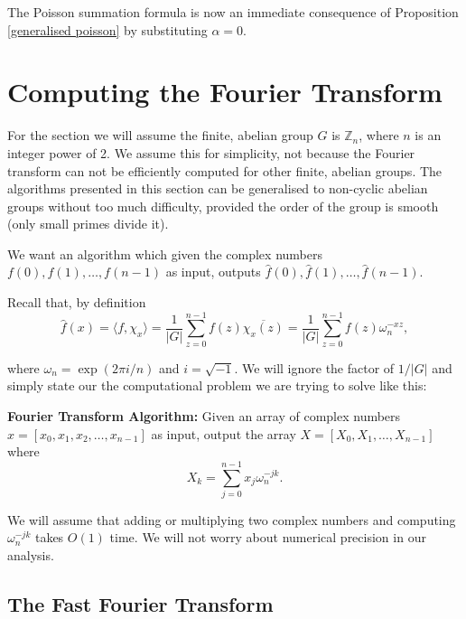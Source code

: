 \documentclass[12pt]{article}
\newcommand{\Z}{\mathbb{Z}}
\begin{document}
The Poisson summation formula is now an immediate consequence of Proposition \ref{generalised poisson} by substituting $\alpha=0$.

\section{Computing the Fourier Transform}
For the section we will assume the finite, abelian group $G$ is $\Z_n$, where $n$ is an integer power of 2.
We assume this for simplicity, not because the Fourier transform can not be efficiently computed for other finite, abelian groups.
The algorithms presented in this section can be generalised to non-cyclic abelian groups without too much difficulty, provided the order of the group is smooth (only small primes divide it).

We want an algorithm which given the complex numbers $f(0), f(1), \dots , f(n-1)$ as input, outputs $\widehat{f}(0), \widehat{f}(1), \dots , \widehat{f}(n-1)$.

Recall that, by definition
\[
    \widehat{f}(x)
    = \langle f, \chi_x\rangle
    = \frac{1}{|G|}\sum_{z = 0}^{n-1} f(z)\overline{\chi_x(z)}
    = \frac{1}{|G|}\sum_{z = 0}^{n-1} f(z)\omega_n^{-xz},
\]

where $\omega_n = \exp(2\pi i /n)$ and $i = \sqrt{-1}$.
We will ignore the factor of $1/|G|$ and simply state our the computational problem we are trying to solve like this:

\begin{mdframed}
    \textbf{Fourier Transform Algorithm:} Given an array of complex numbers $x = [x_0, x_1, x_2, \dots , x_{n-1}]$ as input, output the array $X = [X_0, X_1, \dots , X_{n-1}]$ where
    \begin{equation}\label{fourier equation}
        X_k = \sum_{j = 0}^{n-1} x_j\omega_n^{-jk}.
    \end{equation}
\end{mdframed}
We will assume that adding or multiplying two complex numbers and computing $\omega_n^{-jk}$ takes $O(1)$ time.
We will not worry about numerical precision in our analysis.

\subsection{The Fast Fourier Transform}
\end{document}
